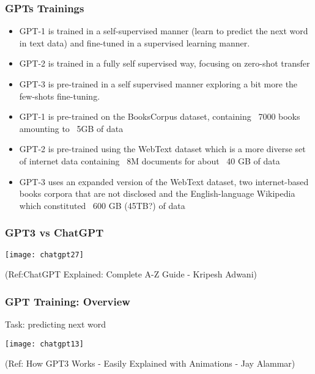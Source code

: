 \begin{frame}[fragile]\frametitle{GPTs Trainings}


\begin{itemize}
\item GPT-1 is trained in a self-supervised manner (learn to predict the next word in text data) and fine-tuned in a supervised learning manner. 
\item GPT-2 is trained in a fully self supervised way, focusing on zero-shot transfer
\item  GPT-3 is pre-trained in a self supervised manner exploring a bit more the few-shots fine-tuning.
\item GPT-1 is pre-trained on the BooksCorpus dataset, containing ~7000 books amounting to ~5GB of data
\item GPT-2 is pre-trained using the WebText dataset which is a more diverse set of internet data containing ~8M documents for about ~40 GB of data
\item GPT-3 uses an expanded version of the WebText dataset, two internet-based books corpora that are not disclosed and the English-language Wikipedia which constituted ~600 GB (45TB?) of data
\end{itemize}	 

\end{frame}

\begin{frame}[fragile]\frametitle{GPT3 vs ChatGPT}


\begin{center}
\texttt{[image: chatgpt27]}
\end{center}		

\tiny{(Ref:ChatGPT Explained: Complete A-Z Guide - Kripesh Adwani)}
\end{frame}

\begin{frame}[fragile]\frametitle{GPT Training: Overview}


Task: predicting next word

\begin{center}
\texttt{[image: chatgpt13]}
\end{center}		


{\tiny (Ref: How GPT3 Works - Easily Explained with Animations - Jay Alammar)}

\end{frame}

